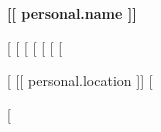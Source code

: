 \documentclass[a4paper,10pt]{article}
\begin{document}
\begin{center}
    {\Large\bfseries [[ personal.name ]]}
    
    \vspace{4pt}
    
    {\small
    [%
    [%
    [%
    [%
    [%
    [%
    [%
    }
    
    [%
    \vspace{2pt}
    {\small [[ personal.location ]]}
    [%
\end{center}

\vspace{4pt}

[%
\end{document}
